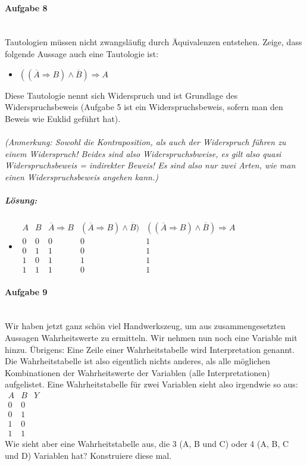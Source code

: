 \documentclass[12pt,a4paper,ngerman]{scrartcl}
\begin{document}
	\paragraph{Aufgabe 8}\mbox{}\\
	Tautologien müssen nicht zwangsläufig durch Äquivalenzen entstehen. Zeige, dass folgende Aussage auch eine Tautologie ist:
	\begin{itemize}
		\item[] $((\overline{A} \Rightarrow B) \wedge \overline{B}) \Rightarrow A$
	\end{itemize}
	Diese Tautologie nennt sich Widerspruch und ist Grundlage des Widerspruchsbeweis (Aufgabe 5 ist ein Widerspruchsbeweis, sofern man den Beweis wie Euklid geführt hat).
	\\\\
	\emph{(Anmerkung: Sowohl die Kontraposition, als auch der Widerspruch führen zu einem Widerspruch! Beides sind also Widerspruchsbweise, es gilt also quasi Widerspruchsbeweis = indirekter Beweis! Es sind also nur zwei Arten, wie man einen Widerspruchsbeweis angehen kann.)}
	
	\subparagraph{Lösung:}
	\begin{itemize}
		\item[] $\begin{array}{cc|c|c|c}
			A & B & \overline{A} \Rightarrow B & (\overline{A} \Rightarrow B) \wedge \overline{B}) & ((\overline{A} \Rightarrow B) \wedge \overline{B}) \Rightarrow A\\
			\hline
			0 & 0 & 0 & 0 & 1\\
			0 & 1 & 1 & 0 & 1\\
			1 & 0 & 1 & 1 & 1\\
			1 & 1 & 1 & 0 & 1
		\end{array}$
	\end{itemize}
	
	\paragraph{Aufgabe 9}\mbox{}\\
	Wir haben jetzt ganz schön viel Handwerkszeug, um aus zusammengesetzten Aussagen Wahrheitswerte zu ermitteln. Wir nehmen nun noch eine Variable mit hinzu. Übrigens: Eine Zeile einer Wahrheitstabelle wird Interpretation genannt. Die Wahrheitstabelle ist also eigentlich nichts anderes, als alle möglichen Kombinationen der Wahrheitswerte der Variablen (alle Interpretationen) aufgelistet. Eine Wahrheitstabelle für zwei Variablen sieht also irgendwie so aus:\\
	$\begin{array}{cc|c}
	A & B & Y\\
	\hline
	0 & 0 & \mbox{ }\\
	0 & 1 & \mbox{ }\\
	1 & 0 & \mbox{ }\\
	1 & 1 & \mbox{ }
	\end{array}$\\
	Wie sieht aber eine Wahrheitstabelle aus, die 3 (A, B und C) oder 4 (A, B, C und D) Variablen hat? Konstruiere diese mal.
	
\end{document}
